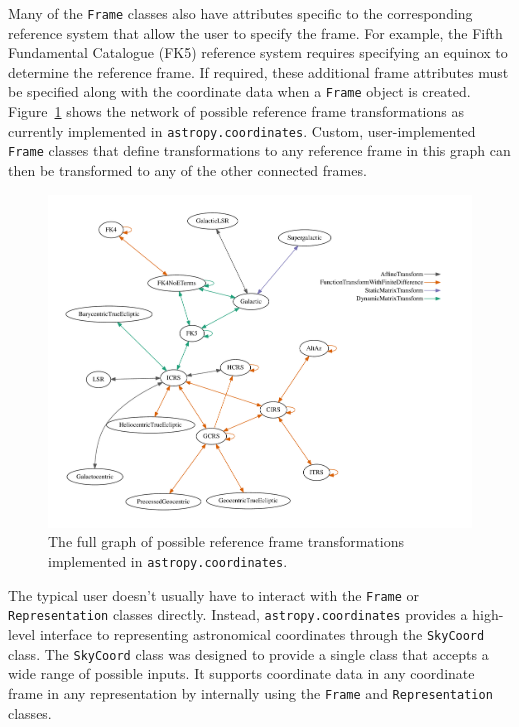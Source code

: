 \documentclass[modern]{aastex61}
\renewcommand{\figurename}{Figure\xspace}
\begin{document}
Many of the \texttt{Frame} classes also have attributes specific to the
corresponding reference system that allow the user to specify the frame.
For example, the Fifth Fundamental Catalogue (FK5) reference system requires
specifying an equinox to determine the reference frame.
If required, these additional frame attributes must be specified along with the
coordinate data when a \texttt{Frame} object is created.
\figurename~\ref{fig:frame-transform-graph} shows the network of possible
reference frame transformations as currently implemented in
\texttt{astropy.coordinates}.
Custom, user-implemented \texttt{Frame} classes that define transformations to
any reference frame in this graph can then be transformed to any of the other
connected frames.

\begin{figure}
\includegraphics[width=\textwidth]{coordinates_graph.pdf}
\caption{%
    The full graph of possible reference frame transformations implemented in
    \texttt{astropy.coordinates}.
    \label{fig:frame-transform-graph}
}
\end{figure}

The typical user doesn't usually have to interact with the \texttt{Frame} or
\texttt{Representation} classes directly.
Instead, \texttt{astropy.coordinates} provides a high-level interface to
representing astronomical coordinates through the \texttt{SkyCoord} class.
The \texttt{SkyCoord} class was designed to provide a single class that
accepts a wide range of possible inputs.
It supports coordinate data in any coordinate frame in any representation by
internally using the \texttt{Frame} and \texttt{Representation} classes.
\end{document}
